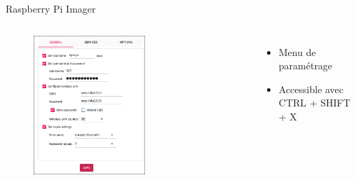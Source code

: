 \documentclass[aspectratio=169,xcolor=dvipsnames]{beamer}
\begin{document}
\begin{frame}{Raspberry Pi Imager}
    \begin{columns}[c] %

        \begin{figure}
            \includegraphics[width=0.6\textwidth]{1/rpi-imager-1.png}
        \end{figure}

        \begin{itemize}
            \item Menu de paramétrage
            \item Accessible avec CTRL + SHIFT + X
        \end{itemize}

    \end{columns}
\end{frame}

\end{document}
